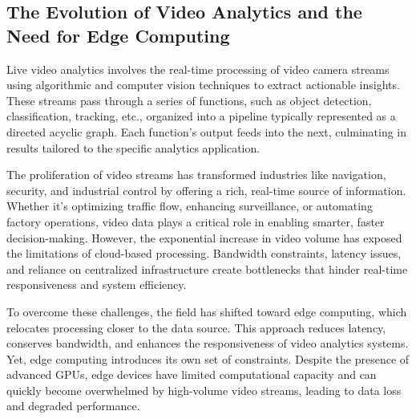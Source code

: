 

\subsection{The Evolution of Video Analytics and the Need for Edge Computing}

Live video analytics involves the real-time processing of video camera streams using algorithmic and computer vision techniques to extract actionable insights. These streams pass through a series of functions, such as object detection, classification, tracking, etc., organized into a pipeline typically represented as a directed acyclic graph. Each function's output feeds into the next, culminating in results tailored to the specific analytics application.

The proliferation of video streams has transformed industries like navigation, security, and industrial control by offering a rich, real-time source of information. Whether it's optimizing traffic flow, enhancing surveillance, or automating factory operations, video data plays a critical role in enabling smarter, faster decision-making. However, the exponential increase in video volume has exposed the limitations of cloud-based processing. Bandwidth constraints, latency issues, and reliance on centralized infrastructure create bottlenecks that hinder real-time responsiveness and system efficiency.

To overcome these challenges, the field has shifted toward edge computing, which relocates processing closer to the data source. This approach reduces latency, conserves bandwidth, and enhances the responsiveness of video analytics systems. Yet, edge computing introduces its own set of constraints. Despite the presence of advanced GPUs, edge devices have limited computational capacity and can quickly become overwhelmed by high-volume video streams, leading to data loss and degraded performance.

